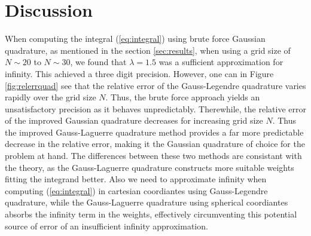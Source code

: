 \documentclass[10pt, twocolumn]{aastex62}
\begin{document}
\section{Discussion} \label{sec:discussion}
When computing the integral (\ref{eq:integral}) using brute force Gaussian
quadrature, as mentioned in the section \ref{sec:results}, when
using a grid size of $N\sim20$ to $N\sim30$, we found that $\lambda = 1.5$ was a
sufficient approximation for infinity. This achieved a three digit
precision. However, one can in Figure \ref{fig:relerrquad} see that the relative
error of the Gauss-Legendre quadrature varies rapidly over the grid size $N$.
Thus, the brute force approach yields an unsatisfactory precision as it behaves unpredictably. Therewhile, the relative
error of the improved Gaussian quadrature decreases for increasing grid size $N$. Thus
the improved Gauss-Laguerre quadrature method provides a far more predictable
decrease in the relative error, making it the Gaussian quadrature of choice for
the problem at hand. The differences between these two methods are consistant
with the theory, as the Gauss-Laguerre quadrature constructs more suitable weights
fitting the integrand better. Also we need to approximate infinity when
computing (\ref{eq:integral}) in cartesian coordiantes using Gauss-Legendre
quadrature, while the Gauss-Laguerre quadrature using spherical coordiantes
absorbs the infinity term in the weights, effectively circumventing this
potential source of error of an insufficient infinity approximation.\\\\\indent
\end{document}

